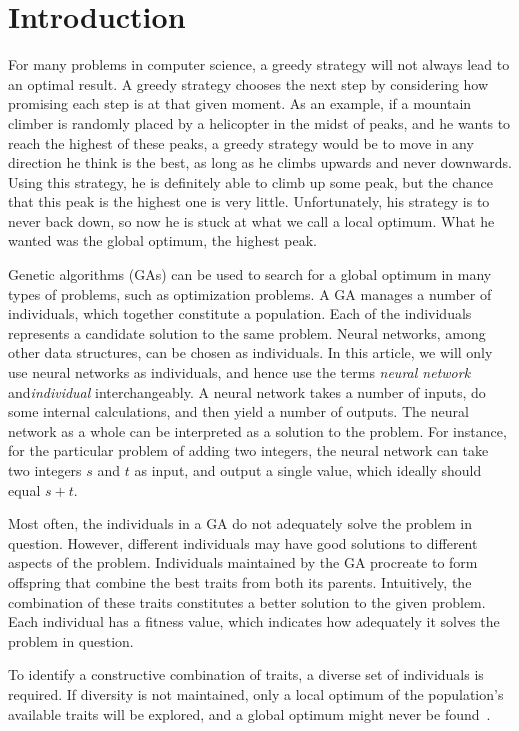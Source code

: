 \section{Introduction}
For many problems in computer science, a greedy strategy will not always lead to an optimal result. A greedy strategy chooses the next step by considering how promising each step is at that given moment. As an example, if a mountain climber is randomly placed by a helicopter in the midst of peaks, and he wants to reach the highest of these peaks, a greedy strategy would be to move in any direction he think is the best, as long as he climbs upwards and never downwards. Using this strategy, he is definitely able to climb up some peak, but the chance that this peak is the highest one is very little. Unfortunately, his strategy is to never back down, so now he is stuck at what we call a local optimum. What he wanted was the global optimum, the highest peak.
 
Genetic algorithms (GAs) can be used to search for a global optimum in many types of problems, such as optimization problems. A GA manages a number of individuals, which together constitute a population. Each of the individuals represents a candidate solution to the same problem. Neural networks, among other data structures, can be chosen as individuals.
In this article, we will only use neural networks as individuals, and hence use the terms \emph{neural network} and\emph{individual} interchangeably.
A neural network takes a number of inputs, do some internal calculations, and then yield a number of outputs.
The neural network as a whole can be interpreted as a solution to the problem.
For instance, for the particular problem of adding two integers, the neural network can take two integers $s$ and $t$ as input, and output a single value, which ideally should equal $s + t$.

Most often, the individuals in a GA do not adequately solve the problem in question.
However, different individuals may have good solutions to different aspects of the problem.
Individuals maintained by the GA procreate to form offspring that combine the best traits from both its parents. Intuitively, the combination of these traits constitutes a better solution to the given problem. Each individual has a fitness value, which indicates how adequately it solves the problem in question.

To identify a constructive combination of traits, a diverse set of individuals is required. If diversity is not maintained, only a local optimum of the population's available traits will be explored, and a global optimum might never be found~\cite{ursem2002diversity,Darwen00doesextra}.

